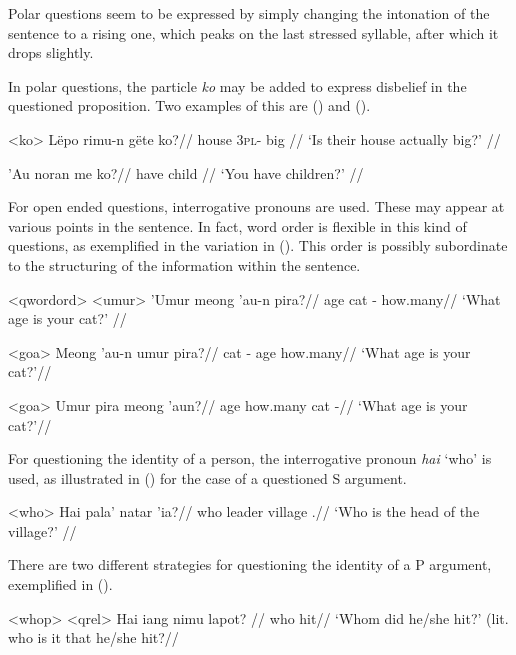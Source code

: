 \documentclass[../hewa_main-subfiles.tex]{subfiles}
\begin{document}
Polar questions seem to be expressed by simply changing the intonation of the sentence to a rising one, which peaks on the last stressed syllable, after which it drops slightly. %

In polar questions, the particle \textit{ko} may be added to express disbelief in the questioned proposition. Two examples of this are () and ().

\ex<ko>
\begingl %
\gla Lëpo rimu-n gëte ko?//
\glb house 3\textsc{pl}-\Poss{} big \Q{}//
\glft `Is their house actually big?' // 
\endgl 
\xe

\begingl %
\gla 'Au noran me ko?//
\glb \Second{}\Sg{} have child \Q{}//
\glft `You have children?' // 
\endgl
\xe

For open ended questions, interrogative pronouns are used. These may appear at various points in the sentence. In fact, word order is flexible in this kind of questions, as exemplified in the variation in (). This order is possibly subordinate to the structuring of the information within the sentence.

\pex<qwordord> %
\a<umur>
\begingl %
\gla 'Umur meong 'au-n pira?//
\glb age cat \Second{}\Sg{}-\Poss{} how.many//
\glft `What age is your cat?' // 
\endgl 

\a<goa> %
\begingl %
\gla Meong 'au-n umur pira?//
\glb cat \Second{}\Sg{}-\Poss{} age how.many//
\glft `What age is your cat?'// 
\endgl

\a<goa> %
\begingl %
\gla Umur pira meong 'aun?//
\glb age how.many cat \Second{}\Sg{}-\Poss{}//
\glft `What age is your cat?'// 
\endgl
\xe


For questioning the identity of a person, the interrogative pronoun \textit{hai} `who' is used, as illustrated in () for the case of a questioned S argument.

\ex<who>
\begingl %
\gla Hai pala' natar 'ia?//
\glb who leader village \Def{}.\Sg{}//
\glft `Who is the head of the village?' //
\endgl
\xe

There are two different strategies for questioning the identity of a P argument, exemplified in (). 

\pex<whop> %
\a<qrel> %
\begingl %
\gla Hai iang nimu lapot? //
\glb who \Rel{} \Third{}\Sg{} hit//
\glft `Whom did he/she hit?' (lit. who is it that he/she hit?//
\endgl
\end{document}
